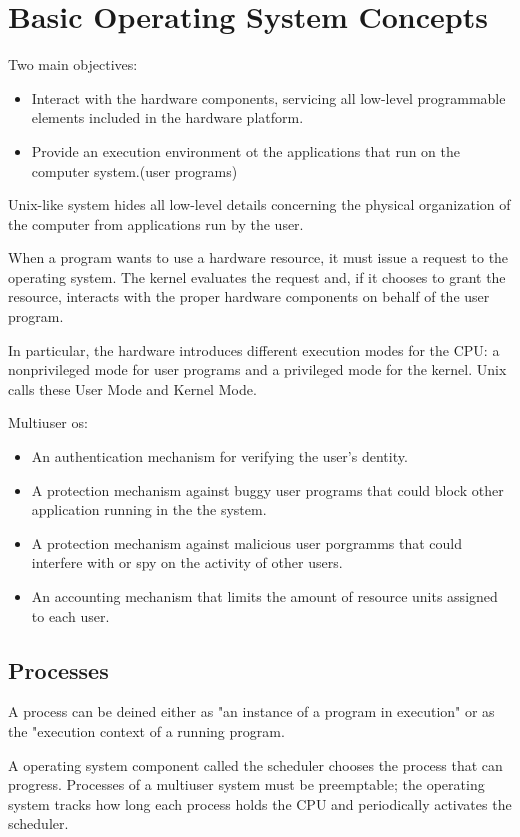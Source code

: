 \documentclass[a4paper,10pt]{book}
\begin{document}
\section{Basic Operating System Concepts}
Two main objectives:
\begin{itemize}
\item Interact with the hardware components, servicing all low-level
programmable elements included in the hardware platform.
\item Provide an execution environment ot the applications that run on the
computer system.(user programs)
\end{itemize}

Unix-like system hides all low-level details concerning the physical
organization of the computer from applications run by the user.

When a program wants to use a hardware resource, it must issue a request to the
operating system. The kernel evaluates the request and, if it chooses to grant
the resource, interacts with the proper hardware components on behalf of the
user program.

In particular, the hardware introduces different execution modes for the CPU: a
nonprivileged mode for user programs and a privileged mode for the kernel. Unix
calls these User Mode and Kernel Mode.

Multiuser os:
\begin{itemize}
\item An authentication mechanism for verifying the user's dentity.
\item A protection mechanism against buggy user programs that could block other
application running in the the system.
\item A protection mechanism against malicious user porgramms that could
interfere with or spy on the activity of other users.
\item An accounting mechanism that limits the amount of resource units assigned
to each user.
\end{itemize}
\subsection{Processes}
A process can be deined either as "an instance of a program in execution" or as
the "execution context of a running program.

A operating system component called the scheduler chooses the process that can
progress. Processes of a multiuser system must be preemptable; the operating
system tracks how long each process holds the CPU and periodically activates the
scheduler.
\end{document}
